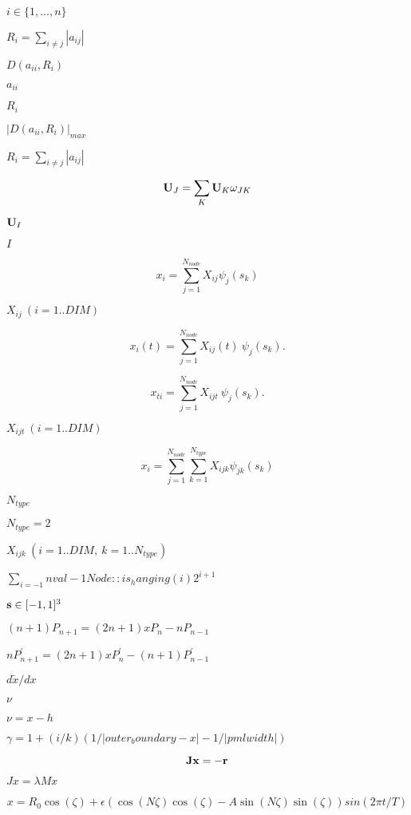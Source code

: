 \documentclass{article}
\begin{document}
$ i \in \{ 1,...,n \} $
\pagebreak

$ R_i = \sum_{i\neq j} |a_{ij}| $
\pagebreak

$ D(a_{ii},R_i) $
\pagebreak

$ a_{ii} $
\pagebreak

$ R_i $
\pagebreak

$ |D(a_{ii},R_i)|_{max} $
\pagebreak

$ R_i = \sum_{i\neq j}|a_{ij}| $
\pagebreak

\[ {\bf U}_J = \sum_{K} {\bf U}_{K} \omega_{JK} \]
\pagebreak

$ {\bf U}_I $
\pagebreak

$ I $
\pagebreak

\[ x_i = \sum_{j=1}^{N_{node}} X_{ij} \psi_{j}(s_k) \]
\pagebreak

$ X_{ij}\ (i=1..DIM) $
\pagebreak

\[ x_i(t) = \sum_{j=1}^{N_{node}} X_{ij}(t) \ \psi_{j}(s_k). \]
\pagebreak

\[ x_{ti} = \sum_{j=1}^{N_{node}} X_{ijt} \ \psi_{j}(s_k). \]
\pagebreak

$ X_{ijt} \ (i=1..DIM) $
\pagebreak

\[ x_i = \sum_{j=1}^{N_{node}} \sum_{k=1}^{N_{type}} X_{ijk} \psi_{jk}(s_k) \]
\pagebreak

$ N_{type} $
\pagebreak

$ N_{type}=2 $
\pagebreak

$ X_{ijk} \ (i=1..DIM, \ k=1..N_{type}) $
\pagebreak

$ \sum_{i=-1}{nval-1} Node::is_hanging(i) 2^{i+1} $
\pagebreak

$ {\bf s} \in [-1,1]^3 $
\pagebreak

$ (n+1) P_{n+1} = (2n+1)xP_{n} - nP_{n-1} $
\pagebreak

$ nP_{n+1}^{'} = (2n+1)xP_{n}^{'} - (n+1)P_{n-1}^{'} $
\pagebreak

$d\tilde x / d x$
\pagebreak

$\nu$
\pagebreak

$\nu = x - h$
\pagebreak

$\gamma=1 + (i/k)(1/|outer_boundary - x|-1/|pml width|)$
\pagebreak

\[ {\bf J} {\bf x} = - \bf{r} \]
\pagebreak

$ Jx = \lambda M x$
\pagebreak

\[ x = R_0 \cos(\zeta) + \epsilon \left( \cos(N \zeta) \cos(\zeta) - A \sin(N \zeta) \sin(\zeta) \right) sin(2 \pi t/T) \]
\pagebreak
\end{document}
